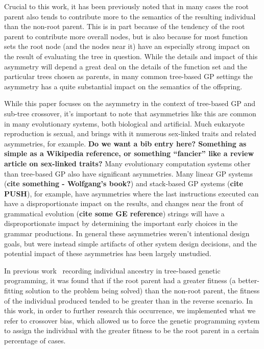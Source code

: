 \documentclass{sig-alternate}
\begin{document}
Crucial to this work, it has been previously noted \cite{McPheeDonatucciDramdahl:2014, McPhee:2008:SBB:
1792694.1792707} that in many cases the root parent also tends to contribute more to the semantics of the resulting 
individual than the non-root parent. This is in part because of the tendency of the root parent to contribute more 
overall nodes, but is also because for most function sets the root node (and the nodes near it) have an especially 
strong impact on the result of evaluating the tree in question. While the details and impact of this asymmetry will 
depend a great deal on the details of the function set and the particular trees chosen as parents, in many common 
tree-based GP settings the asymmetry has a quite substantial impact on the semantics of the offspring.

While this paper focuses on the asymmetry in the context of tree-based GP and sub-tree crossover, it's important to 
note that asymmetries like this are common in many evolutionary systems, both biological and artificial. Much 
eukaryote reproduction is sexual, and brings with it numerous sex-linked traits and related asymmetries, for example. 
\textbf{Do we want a bib entry here? Something as simple as a Wikipedia reference, or something ``fancier'' like a 
review article on sex-linked traits?} Many evolutionary computation systems other than tree-based GP also have 
significant asymmetries. Many linear GP systems (\textbf{cite something - Wolfgang's book?}) and stack-based GP 
systems (\textbf{cite PUSH}), for example, have asymmetries where the last instructions executed can have a 
disproportionate impact on the results, and changes near the front of grammatical evolution (\textbf{cite some GE 
reference}) strings will have a 
disproportionate impact by determining the important early choices in the grammar productions. In general these 
asymmetries weren't intentional design goals, but were instead simple artifacts of other system design decisions, and 
the potential impact of these asymmetries has been largely unstudied.

In previous work~\cite{McPheeDonatucciDramdahl:2014} recording individual ancestry in tree-based genetic 
programming,
it was found that if the root parent had a greater fitness (a better-fitting solution to the problem being solved) than
the non-root parent, the fitness of the individual produced tended to be greater than in the reverse scenario. In this
work, in order to further research this occurrence, we implemented what we refer to crossover bias, which allowed us 
to
force the genetic programming system to assign the individual with the greater fitness to be the root parent in a
certain percentage of cases.
\end{document}
